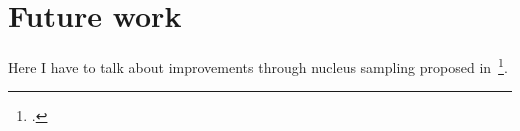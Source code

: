 \section{Future work}
\label{ch:future_work}

Here I have to talk about improvements through nucleus sampling proposed in~\footcite{DBLP:journals/corr/abs-1904-09751}.
